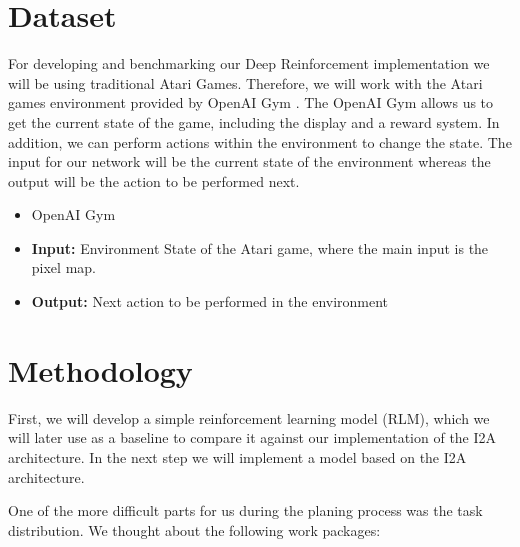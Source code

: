 \documentclass[10pt,twocolumn,letterpaper]{article}
\begin{document}
\section{Dataset}
    For developing and benchmarking our Deep Reinforcement implementation we will be using traditional Atari Games. Therefore, we will work with the Atari games environment provided by OpenAI Gym \cite{openai}. The OpenAI Gym allows us to get the current state of the game, including the display and a reward system. In addition, we can perform actions within the environment to change the state. The input for our network will be the current state of the environment whereas the output will be the action to be performed next.
    \begin{itemize}
        \item OpenAI Gym \cite{openai}
        \item \textbf{Input:} Environment State of the Atari game, where the main input is the pixel map.
        \item \textbf{Output:} Next action to be performed in the environment
    \end{itemize}

\section{Methodology}
    First, we will develop a simple reinforcement learning model (RLM), which we will later use as a baseline to compare it against our implementation of the I2A architecture. In the next step we will implement a model based on the I2A architecture. 

    One of the more difficult parts for us during the planing process was the task distribution. We thought about the following work packages:
    
\end{document}
